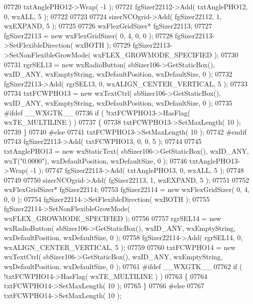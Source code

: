\begin{DoxyCode}
07720     txtAnglePHO12->Wrap( -1 );
07721     fgSizer22112->Add( txtAnglePHO12, 0, wxALL, 5 );
07722     
07723     
07724     sizerNCOgrid->Add( fgSizer22112, 1, wxEXPAND, 5 );
07725     
07726     wxFlexGridSizer* fgSizer22113;
07727     fgSizer22113 = \textcolor{keyword}{new} wxFlexGridSizer( 0, 4, 0, 0 );
07728     fgSizer22113->SetFlexibleDirection( wxBOTH );
07729     fgSizer22113->SetNonFlexibleGrowMode( wxFLEX\_GROWMODE\_SPECIFIED );
07730     
07731     rgrSEL13 = \textcolor{keyword}{new} wxRadioButton( sbSizer106->GetStaticBox(), wxID\_ANY, wxEmptyString, wxDefaultPosition, 
      wxDefaultSize, 0 );
07732     fgSizer22113->Add( rgrSEL13, 0, wxALIGN\_CENTER\_VERTICAL, 5 );
07733     
07734     txtFCWPHO13 = \textcolor{keyword}{new} wxTextCtrl( sbSizer106->GetStaticBox(), wxID\_ANY, wxEmptyString, wxDefaultPosition, 
      wxDefaultSize, 0 );
07735 \textcolor{preprocessor}{    #ifdef \_\_WXGTK\_\_}
07736     \textcolor{keywordflow}{if} ( !txtFCWPHO13->HasFlag( wxTE\_MULTILINE ) )
07737     \{
07738     txtFCWPHO13->SetMaxLength( 10 );
07739     \}
07740 \textcolor{preprocessor}{    #else}
07741     txtFCWPHO13->SetMaxLength( 10 );
07742 \textcolor{preprocessor}{    #endif}
07743     fgSizer22113->Add( txtFCWPHO13, 0, 0, 5 );
07744     
07745     txtAnglePHO13 = \textcolor{keyword}{new} wxStaticText( sbSizer106->GetStaticBox(), wxID\_ANY, wxT(\textcolor{stringliteral}{"0.0000"}), 
      wxDefaultPosition, wxDefaultSize, 0 );
07746     txtAnglePHO13->Wrap( -1 );
07747     fgSizer22113->Add( txtAnglePHO13, 0, wxALL, 5 );
07748     
07749     
07750     sizerNCOgrid->Add( fgSizer22113, 1, wxEXPAND, 5 );
07751     
07752     wxFlexGridSizer* fgSizer22114;
07753     fgSizer22114 = \textcolor{keyword}{new} wxFlexGridSizer( 0, 4, 0, 0 );
07754     fgSizer22114->SetFlexibleDirection( wxBOTH );
07755     fgSizer22114->SetNonFlexibleGrowMode( wxFLEX\_GROWMODE\_SPECIFIED );
07756     
07757     rgrSEL14 = \textcolor{keyword}{new} wxRadioButton( sbSizer106->GetStaticBox(), wxID\_ANY, wxEmptyString, wxDefaultPosition, 
      wxDefaultSize, 0 );
07758     fgSizer22114->Add( rgrSEL14, 0, wxALIGN\_CENTER\_VERTICAL, 5 );
07759     
07760     txtFCWPHO14 = \textcolor{keyword}{new} wxTextCtrl( sbSizer106->GetStaticBox(), wxID\_ANY, wxEmptyString, wxDefaultPosition, 
      wxDefaultSize, 0 );
07761 \textcolor{preprocessor}{    #ifdef \_\_WXGTK\_\_}
07762     \textcolor{keywordflow}{if} ( !txtFCWPHO14->HasFlag( wxTE\_MULTILINE ) )
07763     \{
07764     txtFCWPHO14->SetMaxLength( 10 );
07765     \}
07766 \textcolor{preprocessor}{    #else}
07767     txtFCWPHO14->SetMaxLength( 10 );

\end{DoxyCode}
